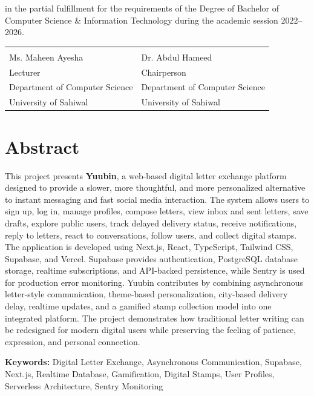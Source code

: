 ﻿\documentclass[12pt,a4paper]{report}
\begin{document}
in the partial fulfillment for the requirements of the Degree of Bachelor of Computer Science \& Information Technology during the academic session 2022--2026.
\vspace{2cm}

\begin{tabular}{p{6cm} p{6cm}}
\hrulefill & \hrulefill \\
Ms. Maheen Ayesha & Dr. Abdul Hameed \\[0.3cm]
Lecturer & Chairperson \\[0.3cm]
Department of Computer Science & Department of Computer Science \\[0.3cm]
University of Sahiwal & University of Sahiwal
\end{tabular}

\chapter*{Abstract}
\thispagestyle{empty}

This project presents \textbf{Yuubin}, a web-based digital letter exchange platform designed to provide a slower, more thoughtful, and more personalized alternative to instant messaging and fast social media interaction. The system allows users to sign up, log in, manage profiles, compose letters, view inbox and sent letters, save drafts, explore public users, track delayed delivery status, receive notifications, reply to letters, react to conversations, follow users, and collect digital stamps. The application is developed using Next.js, React, TypeScript, Tailwind CSS, Supabase, and Vercel. Supabase provides authentication, PostgreSQL database storage, realtime subscriptions, and API-backed persistence, while Sentry is used for production error monitoring. Yuubin contributes by combining asynchronous letter-style communication, theme-based personalization, city-based delivery delay, realtime updates, and a gamified stamp collection model into one integrated platform. The project demonstrates how traditional letter writing can be redesigned for modern digital users while preserving the feeling of patience, expression, and personal connection.

\vspace{0.5cm}

\noindent\textbf{Keywords:} Digital Letter Exchange, Asynchronous Communication, Supabase, Next.js, Realtime Database, Gamification, Digital Stamps, User Profiles, Serverless Architecture, Sentry Monitoring
\end{document}
